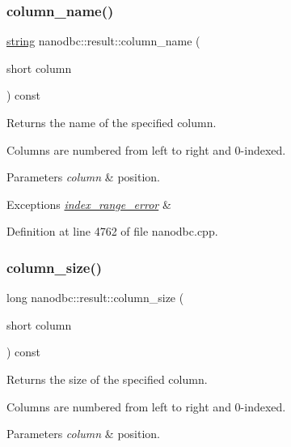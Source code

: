 \subsubsection{\texorpdfstring{column\_name()}{column\_name()}}
{\footnotesize\ttfamily \mbox{\hyperlink{namespacenanodbc_abfc0ece56278e590911ec8352774c212}{string}} nanodbc\+::result\+::column\+\_\+name (\begin{DoxyParamCaption}\item[{short}]{column }\end{DoxyParamCaption}) const}



Returns the name of the specified column. 

Columns are numbered from left to right and 0-\/indexed. 
\begin{DoxyParams}{Parameters}
{\em column} & position. \\
\hline
\end{DoxyParams}

\begin{DoxyExceptions}{Exceptions}
{\em \mbox{\hyperlink{classnanodbc_1_1index__range__error}{index\+\_\+range\+\_\+error}}} & \\
\hline
\end{DoxyExceptions}


Definition at line 4762 of file nanodbc.\+cpp.

\mbox{\label{classnanodbc_1_1result_ae6c9d812e8be9ea46a5cd346e83a6cba}} 
\subsubsection{\texorpdfstring{column\_size()}{column\_size()}\hspace{0.1cm}{\footnotesize\ttfamily [1/2]}}
{\footnotesize\ttfamily long nanodbc\+::result\+::column\+\_\+size (\begin{DoxyParamCaption}\item[{short}]{column }\end{DoxyParamCaption}) const}



Returns the size of the specified column. 

Columns are numbered from left to right and 0-\/indexed. 
\begin{DoxyParams}{Parameters}
{\em column} & position. \\
\hline
\end{DoxyParams}

